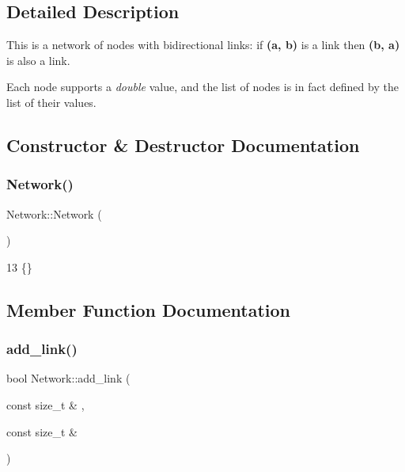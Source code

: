 \subsection{Detailed Description}
This is a network of nodes with bidirectional links\+: if {\bfseries (a, b)} is a link then {\bfseries (b, a)} is also a link.

Each node supports a {\itshape double} value, and the list of nodes is in fact defined by the list of their values. 

\subsection{Constructor \& Destructor Documentation}
\mbox{\label{classNetwork_a3cc2fb4f8fa4d507077e8da85ce5a1c8}} 
\subsubsection{\texorpdfstring{Network()}{Network()}}
{\footnotesize\ttfamily Network\+::\+Network (\begin{DoxyParamCaption}{ }\end{DoxyParamCaption})\hspace{0.3cm}{\ttfamily [inline]}}


\begin{DoxyCode}
13 \{\}
\end{DoxyCode}


\subsection{Member Function Documentation}
\mbox{\label{classNetwork_a2bc02af56e866adf0c55a2c49885551a}} 
\subsubsection{\texorpdfstring{add\+\_\+link()}{add\_link()}}
{\footnotesize\ttfamily bool Network\+::add\+\_\+link (\begin{DoxyParamCaption}\item[{const size\+\_\+t \&}]{,  }\item[{const size\+\_\+t \&}]{ }\end{DoxyParamCaption})}

